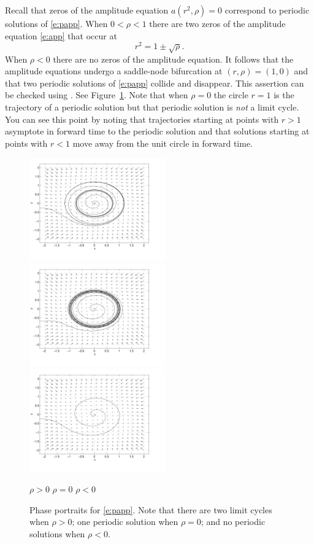 \documentclass{ximera}
\begin{document}
Recall that zeros of the amplitude equation $a(r^2,\rho)=0$ correspond to 
periodic solutions of \eqref{e:papp}.  When $0<\rho<1$ there are two zeros of 
the amplitude equation \eqref{e:app} that occur at 
\[
r^2 = 1 \pm\sqrt{\rho}.
\]
When $\rho<0$ there are no zeros of the amplitude equation.  
It follows that the amplitude equations undergo a saddle-node 
bifurcation at $(r,\rho)=(1,0)$ and that two periodic solutions of 
\eqref{e:papp} collide and disappear.  This assertion can be 
checked using {\pplane}.  
See Figure~\ref{F:papp}. Note that when $\rho=0$
the circle $r=1$ is the trajectory of a periodic solution but that periodic 
solution is {\em not\/} a limit cycle.  You can see this point by noting that 
trajectories starting at points with $r>1$ asymptote in forward time to the 
periodic solution and that solutions starting at points with $r<1$ move away 
from the unit circle in forward time.  

\begin{figure}[htb]
           \centerline{%
	   \includegraphics[width=2.3in]{../figures/pappa.pdf}
	   \includegraphics[width=2.3in]{../figures/pappb.pdf}
	   \includegraphics[width=2.3in]{../figures/pappc.pdf}}
 	\vspace*{-0.2in}
	\hspace{0.3in} $\rho>0$  \hspace{1.9in} $\rho=0$
		\hspace{1.9in} $\rho<0$ 
           \caption{Phase portraits for \protect\eqref{e:papp}. 
Note that there are two limit cycles when $\rho>0$; one periodic solution 
when  $\rho=0$; and no periodic solutions when $\rho<0$.}
           \label{F:papp}
\end{figure}
\end{document}
